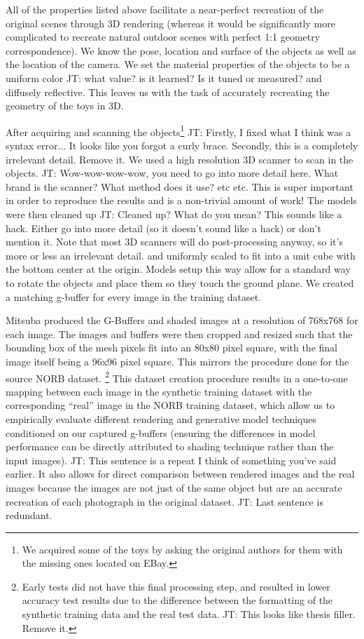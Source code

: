 \documentclass[10pt,twocolumn,letterpaper]{article}
\newcommand{\tompson}[1]{{\color{green} JT: #1}}
\begin{document}
 All of the properties listed above facilitate a near-perfect recreation of the original scenes through 3D rendering (whereas it would be significantly more complicated to recreate natural outdoor scenes with perfect 1:1 geometry correspondence). We know the pose, location and surface of the objects as well as the location of the camera. We set the material properties of the objects to be a uniform color \tompson{what value? is it learned? Is it tuned or measured?} and diffusely reflective. This leaves us with the task of accurately recreating the geometry of the toys in 3D.
 
 After acquiring and scanning the objects\footnote{We acquired some of the toys by asking the original authors for them with the missing ones located on EBay. }\tompson{Firstly, I fixed what I think was a syntax error...  It looks like you forgot a curly brace. Secondly, this is a completely irrelevant detail. Remove it.}%
We used a high resolution 3D scanner to scan in the objects. \tompson{Wow-wow-wow-wow, you need to go into more detail here. What brand is the scanner? What method does it use? etc etc. This is super important in order to reproduce the results and is a non-trivial amount of work!}  %
The models were then cleaned up \tompson{Cleaned up? What do you mean? This sounds like a hack. Either go into more detail (so it doesn't sound like a hack) or don't mention it. Note that most 3D scanners will do post-processing anyway, so it's more or less an irrelevant detail.} and uniformly scaled to fit into a unit cube with the bottom center at the origin.  Models setup this way allow for a standard way to rotate the objects and place them so they touch the ground plane. We created a matching g-buffer for every image in the training dataset.  

Mitsuba produced the G-Buffers and shaded images at a resolution of 768x768 for each image.  The images and buffers were then cropped and resized such that the bounding box of the mesh pixels fit into an 80x80 pixel square, with the final image itself being a 96x96 pixel square. This mirrors the procedure done for the source NORB dataset.  \footnote{Early tests did not have this final processing step, and resulted in lower accuracy test results due to the difference between the formatting of the synthetic training data and the real test data. \tompson{This looks like thesis filler. Remove it.}}
 This dataset creation procedure results in a one-to-one mapping between each image in the synthetic training dataset with the corresponding ``real'' image in the NORB training dataset, which allow us to empirically evaluate different rendering and generative model techniques conditioned on our captured g-buffers (ensuring the differences in model performance can be directly attributed to shading technique rather than the input images). \tompson{This sentence is a repeat I think of something you've said earlier.}
It also allows for direct comparison between rendered images and the real images because the images are not just of the same object but are an accurate recreation of each photograph in the original dataset. \tompson{Last sentence is redundant.}
\end{document}
